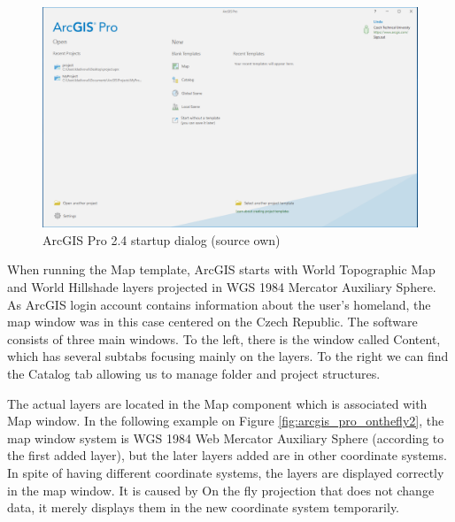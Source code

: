 \documentclass[a4paper,10pt,twoside]{article}
\begin{document}
\vspace{0.3cm}
\begin{figure}[hbt!] 
\begin{center}
\includegraphics[width=15cm]{../pictures/arcgis_startup_screen.png} 
\caption[ArcGIS Pro 2.4 startup dialog (source own)]{ArcGIS Pro 2.4 startup dialog (source own)}
\label{fig:arcgis_startup_screen}
\end{center}
\end{figure}

When running the Map template, ArcGIS starts with World Topographic Map and World Hillshade layers projected in WGS 1984 Mercator Auxiliary Sphere. As ArcGIS login account contains information about the user's homeland, the map window was in this case centered on the Czech Republic. The software consists of three main windows. To the left, there is the window called Content, which has several subtabs focusing mainly on the layers. To the right we can find the Catalog tab allowing us to manage folder and project structures.

The actual layers are located in the Map component which is associated with Map window. In the following example on Figure \ref{fig:arcgis_pro_onthefly2}, the map window system is WGS 1984 Web Mercator Auxiliary Sphere (according to the first added layer), but the later layers added are in other coordinate systems. In spite of having different coordinate systems, the layers are displayed correctly in the map window. It is caused by On the fly projection that does not change data, it merely displays them in the new coordinate system temporarily.
\end{document}
